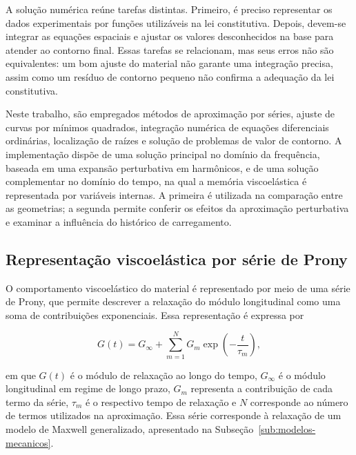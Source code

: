 \documentclass[arial,centeredequations,english,brazilian,oneside,section=TITLE]{ifes8}
\begin{document}
A solução numérica reúne tarefas distintas. Primeiro, é preciso representar os
dados experimentais por funções utilizáveis na lei constitutiva. Depois, devem-se
integrar as equações espaciais e ajustar os valores desconhecidos na base para
atender ao contorno final. Essas tarefas se relacionam, mas seus erros não são
equivalentes: um bom ajuste do material não garante uma integração precisa,
assim como um resíduo de contorno pequeno não confirma a adequação da lei
constitutiva.

Neste trabalho, são empregados métodos de aproximação por séries,
ajuste de curvas por mínimos quadrados, integração numérica de equações diferenciais ordinárias, localização
de raízes e solução de problemas de valor de contorno. A implementação
dispõe de uma solução principal no domínio da frequência, baseada em uma expansão
perturbativa em harmônicos, e de uma solução complementar no domínio do tempo,
na qual a memória viscoelástica é representada por variáveis internas. A primeira
é utilizada na comparação entre as geometrias; a segunda permite conferir os efeitos
da aproximação perturbativa e examinar a influência do histórico de carregamento.

\subsection{Representação viscoelástica por série de Prony}
\label{subsec:serie-prony}

O comportamento viscoelástico do material é representado por meio de
uma série de Prony, que permite descrever a relaxação do módulo
longitudinal como uma soma de contribuições exponenciais. Essa
representação é expressa por

\begin{equation}
  G(t) = G_{\infty} +
  \sum_{m=1}^{N} G_m \exp\left(-\frac{t}{\tau_m}\right),
  \label{eq:prony-relaxacao}
\end{equation}

em que $G(t)$ é o módulo de relaxação ao longo do tempo, $G_{\infty}$
é o módulo longitudinal em regime de longo prazo, $G_m$ representa
a contribuição de cada termo da série, $\tau_m$ é o respectivo tempo
de relaxação e $N$ corresponde ao número de termos utilizados na
aproximação. Essa série corresponde à relaxação de um modelo de Maxwell generalizado,
apresentado na Subseção~\ref{sub:modelos-mecanicos}.
\end{document}
